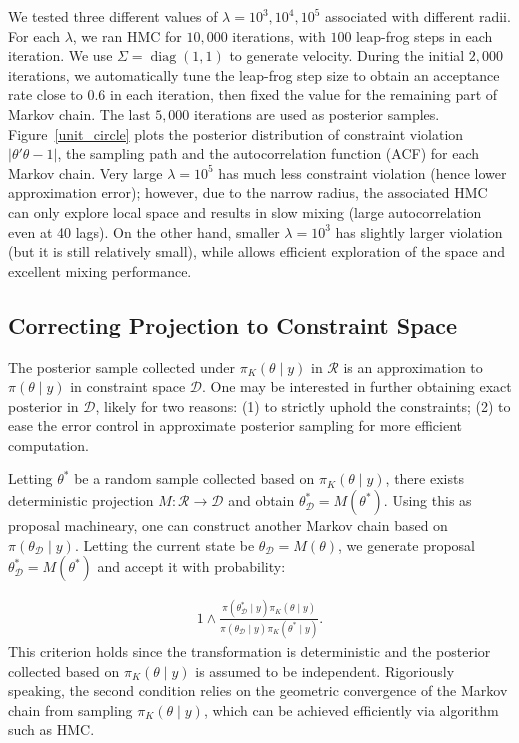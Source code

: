 \documentclass[10pt]{article}
\newcommand{\mc}[1]{\mathcal{#1}}
\DeclareMathOperator{\diag}{diag}
\begin{document}
We tested three different values of $\lambda = 10^3,10^4,10^5$  associated with different radii. For each $\lambda$, we ran HMC for $10,000$ iterations, with $100$ leap-frog steps in each iteration. We use $\Sigma= \diag(1,1)$ to generate velocity. During the initial $2,000$ iterations, we automatically tune the leap-frog step size to obtain an acceptance rate close to $0.6$ in each iteration, then fixed the value for the remaining part of Markov chain. The last $5,000$ iterations are used as posterior samples. Figure~\ref{unit_circle} plots the posterior distribution of constraint violation $|\theta'\theta -1|$, the sampling path and the autocorrelation function (ACF) for each Markov chain. Very large $\lambda=10^5$ has much less constraint violation (hence lower approximation error); however, due to the narrow radius, the associated HMC can only explore local space and results in slow mixing (large autocorrelation even at 40 lags). On the other hand, smaller $\lambda=10^3$ has slightly larger violation (but it is still relatively small), while allows efficient exploration of the space and excellent mixing performance.


\subsection{Correcting Projection to Constraint Space}
 

The posterior sample collected under $\pi_K(\theta \mid y)$ in $\mc R$ is an approximation to $\pi(\theta\mid y)$ in constraint space $\mc D$. One may be interested in further obtaining exact posterior in $\mc D$, likely for two reasons:  (1) to strictly uphold the constraints; (2) to ease the error control in approximate posterior sampling for more efficient computation.

Letting $\theta^*$ be a random sample collected based on $\pi_K(\theta \mid y)$, there exists deterministic projection $M: \mc R\rightarrow \mc D$ and obtain $\theta^*_{\mc D}= M(\theta^*)$. Using this as proposal machineary, one can construct another Markov chain based on $\pi(\theta_{\mc D}  \mid y)$. Letting the current state be $\theta_{\mc D} = M(\theta)$, we generate proposal $\theta^*_{\mc D}= M(\theta^*)$ and accept it with probability:


\begin{equation}
 \begin{aligned}
 1 \wedge \frac{\pi(\theta^*_{\mc D} \mid y) \pi_K(\theta  \mid y) }{\pi(\theta_{\mc D}  \mid y)\pi_K(\theta^* \mid y)}.
 \end{aligned}
 \end{equation}
 This criterion holds since the transformation is deterministic and the posterior collected based on $\pi_K(\theta\mid y)$ is assumed to be independent. Rigoriously speaking, the second condition relies on the geometric convergence of the Markov chain from sampling $\pi_K(\theta \mid y)$, which can be achieved efficiently via algorithm such as HMC.
\end{document}
